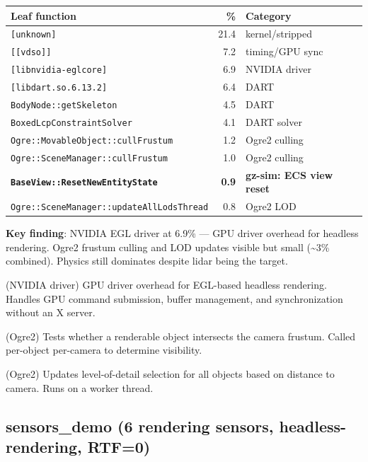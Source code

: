 \documentclass[11pt, a4paper]{article}
\begin{document}
\begin{longtable}[]{@{}lrl@{}}
\toprule\noalign{}
Leaf function & \% & Category \\
\midrule\noalign{}
\endhead
\bottomrule\noalign{}
\endlastfoot
\texttt{{[}unknown{]}} & 21.4 & kernel/stripped \\
\texttt{{[}{[}vdso{]}{]}} & 7.2 & timing/GPU sync \\
\texttt{{[}libnvidia-eglcore{]}} & 6.9 & NVIDIA driver \\
\texttt{{[}libdart.so.6.13.2{]}} & 6.4 & DART \\
\texttt{BodyNode::getSkeleton} & 4.5 & DART \\
\texttt{BoxedLcpConstraintSolver} & 4.1 & DART solver \\
\texttt{Ogre::MovableObject::cullFrustum} & 1.2 & Ogre2 culling \\
\texttt{Ogre::SceneManager::cullFrustum} & 1.0 & Ogre2 culling \\
\textbf{\texttt{BaseView::ResetNewEntityState}} & \textbf{0.9} & \textbf{gz-sim: ECS view reset} \\
\texttt{Ogre::SceneManager::updateAllLodsThread} & 0.8 & Ogre2 LOD \\
\end{longtable}

\textbf{Key finding}: NVIDIA EGL driver at 6.9\% --- GPU driver overhead
for headless rendering. Ogre2 frustum culling and LOD updates visible
but small (\textasciitilde3\% combined). Physics still dominates despite
lidar being the target.

\begin{description}[style=nextline, leftmargin=1.5cm]
\item[\texttt{libnvidia-eglcore}] (NVIDIA driver) GPU driver overhead for EGL-based headless rendering. Handles GPU command submission, buffer management, and synchronization without an X server.
\item[\texttt{Ogre::MovableObject::cullFrustum}] (Ogre2) Tests whether a renderable object intersects the camera frustum. Called per-object per-camera to determine visibility.
\item[\texttt{Ogre::SceneManager::updateAllLodsThread}] (Ogre2) Updates level-of-detail selection for all objects based on distance to camera. Runs on a worker thread.
\end{description}

\hypertarget{sensors_demo-6-rendering-sensors-headless-rendering-rtf0}{%
\subsection{sensors\_demo (6 rendering sensors,
headless-rendering,
RTF=0)}\label{sensors_demo-6-rendering-sensors-headless-rendering-rtf0}}
\end{document}
